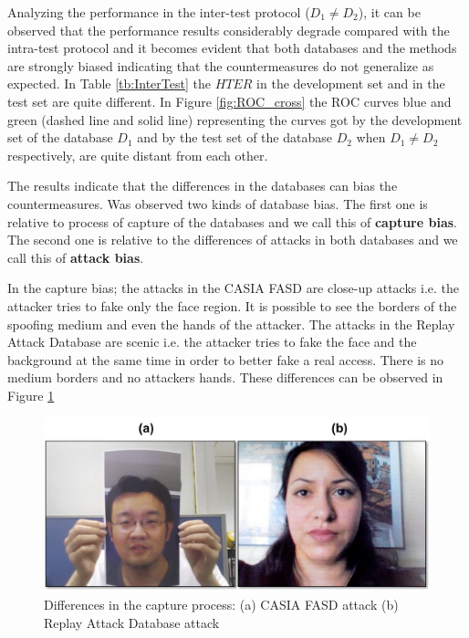 Analyzing the performance in the inter-test protocol ($D_1 \neq D_2$), it can be observed that the performance results considerably degrade compared with the intra-test protocol and it becomes evident that both databases and the methods are strongly biased indicating that the countermeasures do not generalize as expected. In Table \ref{tb:InterTest} the $HTER$ in the development set and in the test set are quite different. In Figure \ref{fig:ROC_cross} the ROC curves blue and green (dashed line and solid line) representing the curves got by the development set of the database $D_1$ and by the test set of the database $D_2$ when $D_1 \neq D_2$ respectively, are quite distant from each other. 


The results indicate that the differences in the databases can bias the countermeasures. Was observed two kinds of database bias. The first one is relative to process of capture of the databases and we call this of \textbf{capture bias}. The second one is relative to the differences of attacks in both databases and we call this of \textbf{attack bias}.

In the capture bias; the attacks in the CASIA FASD are close-up attacks i.e. the attacker tries to fake only the face region. It is possible to see the borders of the spoofing medium and even the hands of the attacker. The attacks in the Replay Attack Database are scenic i.e. the attacker tries to fake the face and the background at the same time in order to better fake a real access. There is no medium borders and no attackers hands. These differences can be observed in Figure \ref{fig:database_differences} 

\begin{figure}[!btb]
\begin{center}
\includegraphics [width=12cm] {images/casia_replay_differenes.pdf}
\caption[Differences in the capture process]{Differences in the capture process: (a) CASIA FASD attack (b) Replay Attack Database attack } 
\label{fig:database_differences}
\end{center}
\end{figure}

